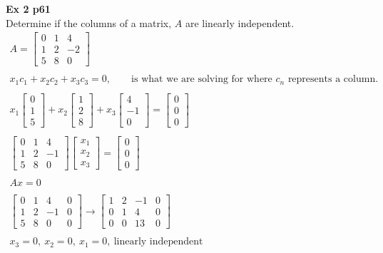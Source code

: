 \documentclass{article}
\begin{document}
  \textbf{Ex 2 p61}\\
  Determine if the columns of a matrix, $ A $ are linearly independent.
  \[
    \begin{gathered}
    A=\begin{bmatrix}
      0 &1 &4\\
      1 &2 &-2\\
      5 &8 &0
    \end{bmatrix}\\
    ~\\
    x_{1}c_{1}+x_{2}c_{2}+x_{3}c_{3}=0, \qquad \text{is what we are solving for where } c_{n} \text{ represents a column.}\\
    ~\\
    x_{1}\begin{bmatrix}
      0\\
      1\\
      5
    \end{bmatrix} +
    x_{2}\begin{bmatrix}
      1 \\
      2\\
      8
    \end{bmatrix} +x_{3} \begin{bmatrix}
      4\\
      -1\\
      0
    \end{bmatrix}  = \begin{bmatrix}
      0\\
      0\\
      0
    \end{bmatrix}\\
    ~\\
    \begin{bmatrix}
      0 &1 &4\\
      1 &2 &-1\\
      5 &8 &0
    \end{bmatrix}
    \begin{bmatrix}
      x_{1}\\
      x_{2}\\
      x_{3}  
    \end{bmatrix} =
    \begin{bmatrix}
      0\\
      0\\
      0
    \end{bmatrix}\\
    ~\\
    Ax=0 \\
    ~\\
    \begin{bmatrix}
      0 &1 &4 &0\\
      1 &2 &-1 &0\\
      5 &8 &0 &0
    \end{bmatrix}\to
    \begin{bmatrix}
      1 &2 &-1 &0\\
      0 &1 &4 &0\\
      0 &0 &13 &0
    \end{bmatrix}\\
    ~\\
    x_{3}=0,~x_{2}=0,~x_{1}=0,~\text{linearly independent}
    \end{gathered}
  \]
  
\end{document}
